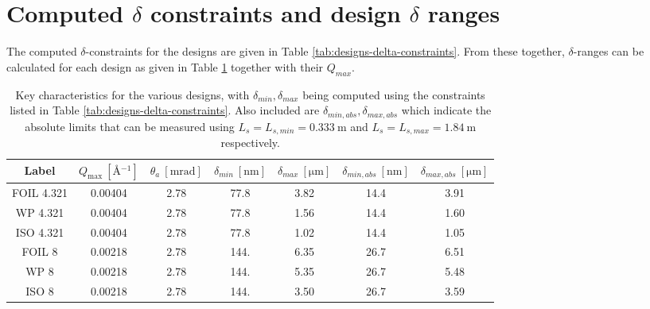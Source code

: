 \section{Computed $\delta$ constraints and design $\delta$ ranges}
\label{c4.2}
The computed $\delta$-constraints for the designs are given in Table \ref{tab:designs-delta-constraints}. From these together, $\delta$-ranges can be calculated for each design as given in Table \ref{tab:designs-final-ranges} together with their $Q_{max}$.
\begin{table}[h!]
	\centering
	\begin{tabular}{c | c c c c | cc}
		\toprule
		Label & $Q_{\text{max}} ~[\unit{\angstrom^{-1}}]$ & $\theta_a~[\unit{\milli\radian}]$ & $\delta_{min}~[\unit{\nano\meter}]$ & $\delta_{max}~[\unit{\micro\meter}]$ & $\delta_{min,abs}~[\unit{\nano\meter}]$ & $\delta_{max,abs}~[\unit{\micro\meter}]$ \\
		\midrule
FOIL 4.321 & \num{0.00404} & \num{2.78} & \num{77.8} & \num{3.82} & \num{14.4} & \num{3.91} \\
WP 4.321 & \num{0.00404} & \num{2.78} & \num{77.8} & \num{1.56} & \num{14.4} & \num{1.60} \\
ISO 4.321 & \num{0.00404} & \num{2.78} & \num{77.8} & \num{1.02} & \num{14.4} & \num{1.05} \\
FOIL 8 & \num{0.00218} & \num{2.78} & \num{144.} & \num{6.35} & \num{26.7} & \num{6.51} \\
WP 8 & \num{0.00218} & \num{2.78} & \num{144.} & \num{5.35} & \num{26.7} & \num{5.48} \\
ISO 8 & \num{0.00218} & \num{2.78} & \num{144.} & \num{3.50} & \num{26.7} & \num{3.59} \\
		\bottomrule
	\end{tabular}
	\caption{Key characteristics for the various designs, with $\delta_{min}, \delta_{max}$ being computed using the constraints listed in Table \ref{tab:designs-delta-constraints}. Also included are $\delta_{min,abs}, \delta_{max,abs}$ which indicate the absolute limits that can be measured using $L_s = L_{s,min} = \SI{0.333}{\meter}$ and $L_s = L_{s,max} = \SI{1.84}{\meter}$ respectively.}
	\label{tab:designs-final-ranges}
\end{table}
